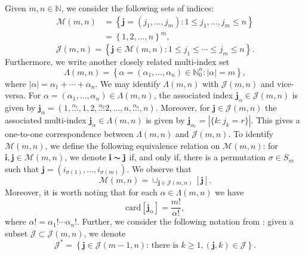 \documentclass[a4paper,12pt]{amsart}
\theoremstyle{definition}
\begin{document}
Given $m,n\in \mathbb{N}$, we consider the following sets of indices:
\begin{align*}
	\mathcal{M}(m,n)&=\left\{\mathbf{j}=(j_1,\ldots,j_m): 1\leq j_1,\ldots,j_m\leq n\right\}\\ &
	=\left\{1,2,\ldots,n\right\}^m,
\end{align*} 
\begin{equation*}
	\mathcal{J}(m,n)=\left\{\mathbf{j}\in \mathcal{M}(m,n): 1\leq j_1\leq \cdots\leq j_m\leq n\right\}.
\end{equation*}
Furthermore, we write another closely related multi-index set
\begin{equation*}
	\Lambda(m,n)=\left\{\alpha=(\alpha_1,\ldots,\alpha_n)\in \mathbb{N}^n_{0}: |\alpha|=m\right\},
\end{equation*}
where $|\alpha|=\alpha_1+\cdots+\alpha_n$. We may identify $\Lambda(m,n)$ with $	\mathcal{J}(m,n)$ and vice-versa. For $\alpha=(\alpha_1,\ldots,\alpha_n)\in \Lambda(m,n)$, the associated index $\mathbf{j}_{\alpha}\in \mathcal{J}(m,n)$ is given by $\mathbf{j}_{\alpha}=\left(1,\stackrel{\alpha_1}{\ldots},1, 2,\stackrel{\alpha_{2}}{\ldots}2, \ldots,n,\stackrel{\alpha_n}{\ldots},n\right)$.
Moreover, for $\mathbf{j}\in \mathcal{J}(m,n)$ the associated multi-index $\mathbf{j}_{\alpha}\in \Lambda(m,n)$ is given by $\mathbf{j}_{\alpha_r}=|\{k:j_k=r\}|$. This gives a one-to-one correspondence between $\Lambda(m,n)$ and $\mathcal{J}(m,n)$. To identify $\mathcal{M}(m,n)$, we define the following equivalence relation on $\mathcal{M}(m,n)$: for $\mathbf{i}, \mathbf{j}\in \mathcal{M}(m,n)$, we denote $\mathbf{i} \thicksim \mathbf{j}$ if, and only if, there is a permutation $\sigma \in S_m$ such that $\mathbf{j}=(i_{\sigma(1)},\ldots,i_{\sigma(m)})$. We observe that 
\begin{equation*}
	\mathcal{M}(m,n)=\cup_{\mathbf{j}\in \mathcal{J}(m,n)}[\mathbf{j}].
\end{equation*} 
Moreover, it is worth noting that for each $\alpha\in \Lambda(m,n)$ we have
\begin{equation*}
	\text{card}[\mathbf{j}_{\alpha}]=\frac{m!}{\alpha!},
\end{equation*}
where $\alpha!=\alpha_1!\cdots\alpha_n!$. Further, we consider the following notation from \cite{bayart-J-Anal-2019}: given a subset $\mathcal{J}\subset \mathcal{J}(m,n)$, we denote
\begin{equation*}
	\mathcal{J}^*=\left\{\mathbf{j}\in \mathcal{J}(m-1,n): \,\mbox{there is}\,\,k\geq 1, (\mathbf{j},k)\in \mathcal{J}\right\}.
\end{equation*}
\vspace{1mm}
\end{document}
